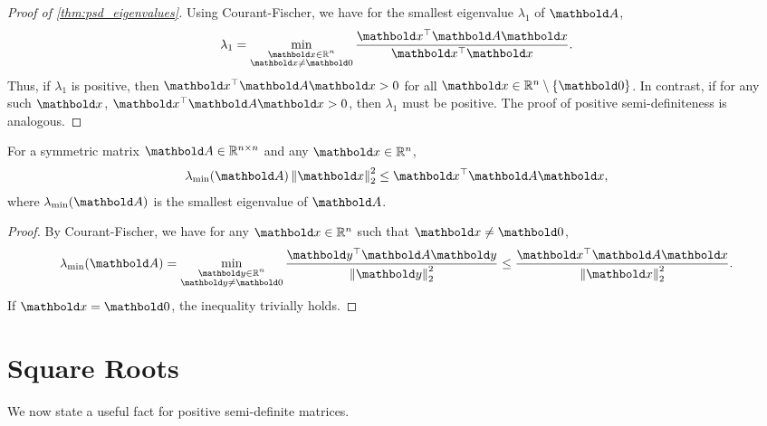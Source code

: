 \begin{proof}[Proof of \cref{thm:psd_eigenvalues}] Using Courant-Fischer, we have for the smallest eigenvalue $\lambda_1$ of $\mA$, \begin{align*}
    \lambda_1 = \min_{\substack{\vx \in \R^n \\ \vx \neq \vZero}} \frac{\trans{\vx}\mA\vx}{\trans{\vx}\vx}.
\end{align*} Thus, if $\lambda_1$ is positive, then $\trans{\vx}\mA\vx > 0$ for all $\vx \in \R^n \setminus \{\vZero\}$. In contrast, if for any such $\vx$, $\trans{\vx}\mA\vx > 0$, then $\lambda_1$ must be positive. The proof of positive semi-definiteness is analogous.
\end{proof}

\begin{cor}\label{lem:quadratic_form_lower_bound}
    For a symmetric matrix $\mA \in \R^{n \times n}$ and any $\vx \in \R^n$, \begin{align}
        \lambda_{\min}(\mA) \norm{\vx}_2^2 \leq \trans{\vx}\mA\vx,
    \end{align} where $\lambda_{\min}(\mA)$ is the smallest eigenvalue of $\mA$.
\end{cor}
\begin{proof}
By Courant-Fischer, we have for any $\vx \in \R^n$ such that $\vx \neq \vZero$, \begin{align*}
    \lambda_{\min}(\mA) = \min_{\substack{\vy \in \R^n \\ \vy \neq \vZero}} \frac{\trans{\vy}\mA\vy}{\norm{\vy}_2^2} \leq \frac{\trans{\vx}\mA\vx}{\norm{\vx}_2^2}.
\end{align*} If $\vx = \vZero$, the inequality trivially holds.
\end{proof}

\section{Square Roots}

We now state a useful fact for positive semi-definite matrices.

